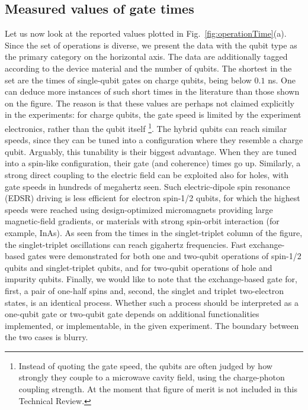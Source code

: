 \documentclass[aps, prx, showpacs, twocolumn, superscriptaddress, notitlepage, longbibliography, floatfix, nofootinbib]{revtex4-2}
\newcommand{\recheck}[1]{{#1}}
\begin{document}
\subsection{Measured values of gate times}

Let us now look at the reported values plotted in Fig.~\ref{fig:operationTime}(a). Since the set of operations is diverse, we present the data with the qubit type as the primary category on the horizontal axis. The data are additionally tagged according to the device material and the number of qubits. \recheck{The shortest in the set are the times of single-qubit gates on charge qubits, being below $0.1$ ns.} One can deduce more instances of such short times in the literature than those shown on the figure. The reason is that these values are perhaps not claimed explicitly in the experiments: for charge qubits, the gate speed is limited by the experiment electronics, rather than the qubit itself \footnote{Instead of quoting the gate speed, the qubits are often judged by how strongly they couple to a microwave cavity field, using the charge-photon coupling strength. At the moment that figure of merit is not included in this Technical Review.}. \recheck{The hybrid qubits can reach similar speeds,} since they can be tuned into a configuration where they resemble a charge qubit. Arguably, this tunability is their biggest advantage. When they are tuned into a spin-like configuration, their gate (and coherence) times go up. Similarly, a strong direct coupling to the electric field can be exploited also for \recheck{holes, with gate speeds in hundreds of megahertz seen}. Such electric-dipole spin resonance (EDSR) driving is less efficient for electron spin-1/2 qubits, for which \recheck{the highest speeds were reached using design-optimized micromagnets providing large magnetic-field gradients, or materials with strong spin-orbit interaction (for example, InAs).} As seen from the times in the singlet-triplet column of the figure, the singlet-triplet oscillations can reach gigahertz frequencies. Fast exchange-based gates were demonstrated for both one and two-qubit operations of spin-1/2 qubits and singlet-triplet qubits, and for two-qubit operations of hole and impurity qubits. Finally, we would like to note that the exchange-based gate for, first, a pair of one-half spins and, second, the singlet and triplet two-electron states, is an identical process. Whether such a process should be interpreted as a one-qubit gate or two-qubit gate depends on additional functionalities implemented, or implementable, in the given experiment. The boundary between the two cases is blurry. 
\end{document}
